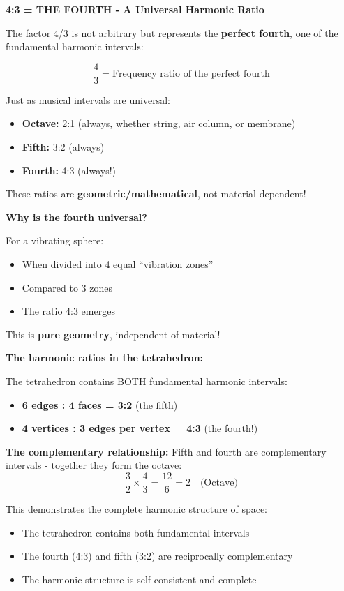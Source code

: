 \documentclass[12pt,a4paper]{article}
\begin{document}
\textbf{4:3 = THE FOURTH - A Universal Harmonic Ratio}

The factor 4/3 is not arbitrary but represents the \textbf{perfect fourth}, one of the fundamental harmonic intervals:

\begin{equation}
	\frac{4}{3} = \text{Frequency ratio of the perfect fourth}
\end{equation}

Just as musical intervals are universal:
\begin{itemize}
	\item \textbf{Octave:} 2:1 (always, whether string, air column, or membrane)
	\item \textbf{Fifth:} 3:2 (always)
	\item \textbf{Fourth:} 4:3 (always!)
\end{itemize}

These ratios are \textbf{geometric/mathematical}, not material-dependent!

\textbf{Why is the fourth universal?}

For a vibrating sphere:
\begin{itemize}
	\item When divided into 4 equal ``vibration zones''
	\item Compared to 3 zones
	\item The ratio 4:3 emerges
\end{itemize}

This is \textbf{pure geometry}, independent of material!

\textbf{The harmonic ratios in the tetrahedron:}

The tetrahedron contains BOTH fundamental harmonic intervals:
\begin{itemize}
	\item \textbf{6 edges : 4 faces = 3:2} (the fifth)
	\item \textbf{4 vertices : 3 edges per vertex = 4:3} (the fourth!)
\end{itemize}

\textbf{The complementary relationship:}
Fifth and fourth are complementary intervals - together they form the octave:
\begin{equation}
	\frac{3}{2} \times \frac{4}{3} = \frac{12}{6} = 2 \quad \text{(Octave)}
\end{equation}

This demonstrates the complete harmonic structure of space:
\begin{itemize}
	\item The tetrahedron contains both fundamental intervals
	\item The fourth (4:3) and fifth (3:2) are reciprocally complementary
	\item The harmonic structure is self-consistent and complete
\end{itemize}
\end{document}
